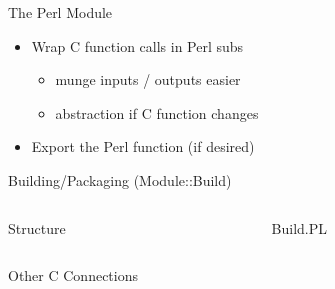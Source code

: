 \documentclass{beamer}
\begin{document}
\begin{frame}[fragile]{The Perl Module}
  \begin{block}{}
    \scriptsize
    
  \end{block}
  \begin{itemize}
    \item Wrap C function calls in Perl subs
    \begin{itemize}
      \item munge inputs / outputs easier
      \item abstraction if C function changes
    \end{itemize}
    \item Export the Perl function (if desired)
  \end{itemize}
\end{frame}

\begin{frame}{Building/Packaging (Module::Build)}
  
  \begin{columns}
    \begin{column}{0.49\linewidth}
      \begin{block}{Structure}
      \end{block}
      \vspace{4mm}
    \end{column}
    \begin{column}{0.49\linewidth}
      \scriptsize
      \begin{block}{Build.PL}
        
      \end{block}
    \end{column}
  \end{columns}
\end{frame}

\begin{frame}{Other C Connections}

\end{frame}
\end{document}
